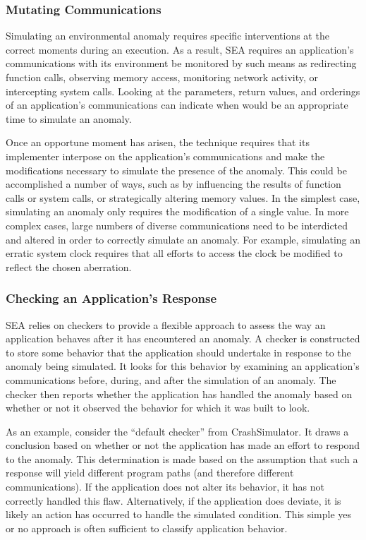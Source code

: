 \subsubsection{Mutating Communications}
\label{SUBSUB:MutatingCommunications}
Simulating an environmental anomaly requires specific interventions at the
correct moments during an execution.
As a result,
SEA requires
an application's communications
with its environment
be monitored
by such means as
redirecting function calls,
observing memory access,
monitoring network activity,
or intercepting system calls.
Looking at the parameters,
return values,
and orderings
of an application's communications
can indicate
when would be an appropriate time to simulate an anomaly.

Once an opportune moment has arisen,
the technique requires that its implementer
interpose on the application's communications
and make the modifications necessary
to simulate the presence
of the anomaly.
This could be accomplished
a number of ways,
such as
by influencing the results of function calls or system calls,
or strategically altering memory values.
In the simplest case,
simulating an anomaly only requires
the modification of a single value.
In more complex cases,
large numbers of diverse communications
need to be interdicted and altered
in order to correctly simulate an anomaly.
For example,
simulating an erratic system clock
requires that all efforts
to access the clock
be modified to reflect the chosen aberration.

\subsubsection{Checking an Application's Response}
\label{SUBSUB:CheckingResponse}
SEA relies on checkers
to provide a flexible approach to assess the way an application
behaves after it has encountered an anomaly.
A checker is constructed to store
some behavior that the application should undertake
in response to the anomaly being simulated.
It looks for this behavior by examining an application's communications
before, during, and after the simulation of an anomaly.
The checker then reports whether the application has handled
the anomaly based on whether or not it observed the behavior for which it
was built to look.

As an example, consider the ``default checker'' from CrashSimulator.
It draws a conclusion based on
whether or not the application
has made an effort to respond
to the anomaly.
This determination is made based
on the assumption
that such a response will yield
different program paths (and therefore different communications).
If the application
does not alter its behavior, it has not
correctly handled this flaw.
Alternatively,
if the application does deviate,
it is likely
an action has occurred to handle the simulated condition.
This simple yes or no approach
is often sufficient
to classify application behavior.



